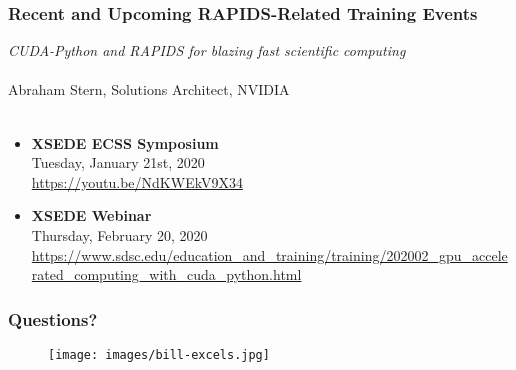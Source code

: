 \documentclass{beamer}
\begin{document}
\begin{frame}
   \frametitle{Recent and Upcoming RAPIDS-Related Training Events}
   \textit{CUDA-Python and RAPIDS for blazing fast scientific computing}
   \\ \ \\
   Abraham Stern, Solutions Architect, NVIDIA 
   \\ \ \\
   \begin{itemize}\setlength\itemsep{1.5em}
      \item \textbf{XSEDE ECSS Symposium} \\
            Tuesday, January 21st, 2020 \\
            \url{https://youtu.be/NdKWEkV9X34}  
      \item \textbf{XSEDE Webinar} \\
            Thursday, February 20, 2020 \\
\url{https://www.sdsc.edu/education_and_training/training/202002_gpu_accelerated_computing_with_cuda_python.html}
   \end{itemize}
\end{frame}

\begin{frame}
   \frametitle{Questions?}
   \begin{figure}[htbp]
      \texttt{[image: images/bill-excels.jpg]}
   \end{figure}
\end{frame}
\end{document}
